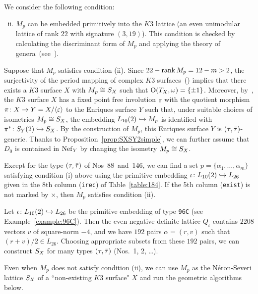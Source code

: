\documentclass{amsart}
\numberwithin{procedure}{section}
\begin{document}
%
We consider the following condition:
%
\begin{enumerate}[(i)]
\setcounter{enumi}{1}
%
\item $M_p$ can be embedded primitively
into the $K3$ lattice
(an even unimodular lattice of rank $22$ with signature $(3, 19)$).
This condition is checked by calculating the discriminant form of $M_p$
and applying the theory of genera~(see~\cite{Nikulin79}).
%
\end{enumerate}
%
Suppose that $M_p$ satisfies condition (ii).
Since $22-\operatorname{\mathrm{rank}}\nolimits M_{p}=12-m>2$,
the surjectivity of the period mapping
of complex $K3$ surfaces~(\cite[Chapter~VIII]{CCSBook}) implies that
there exists a $K3$ surface $X$ with $M_p \cong S_{X} $
such that $\mathord{\mathrm{O}}(T_X, \omega)=\{\pm 1\}$.
Moreover,
by~\cite{Keum1990},
the $K3$ surface $X$ has a fixed point free involution $\varepsilon$
with the quotient morphism $\pi\colon X\to Y=X/\langle\varepsilon\rangle$
to the Enriques surface $Y$
such that, under suitable choices of
isometries $M_p \cong S_{X} $, the embedding $L_{10}(2)\hookrightarrow M_p$
is identified with $\pi^*\colon S_{Y}(2)\hookrightarrow S_{X}$.
By the construction of $M_p$,
this Enriques surface $Y$ is $(\tau, \bar{\tau})$-generic.
Thanks to Proposition~\ref{prop:SXSY2simple},
we can further assume that
$D_0$ is contained in $\mathord{\rm Nef}_{Y}$ by
changing the isometry $M_p \cong S_{X}$.
%
\par
%
Except for the type $(\tau, \bar{\tau})$ of Nos~88~and~146,
we can find a set $p=\{\alpha_1, \dots, \alpha_m\}$ satisfying condition (i)  above
using the primitive embedding $\iota\colon L_{10}(2)\hookrightarrow L_{26}$
given in the 8th column ({\tt irec})  of Table~\ref{table:184}.
If the 5th column ({\tt exist}) is not marked by $\times$, then  $M_p$  satisfies 
condition (ii). 
%
\begin{example}\label{example:constructSX}
Let $\iota\colon L_{10}(2)\hookrightarrow L_{26}$
be the primitive embedding of type {\tt 96C}
(see Example~\ref{example:96C}).
Then the even negative definite lattice $Q_{\iota}$
contains  $2208$ vectors $v$ of square-norm  $-4$,
and we have $192$ pairs $\alpha=(r, v)$ such that $(r+v)/2\in L_{26}$.
Choosing appropriate subsets  from these $192$ pairs,
we can construct $S_{X}$ for many types $(\tau, \bar{\tau})$ (Nos.~1, 2, \dots).
\end{example}
%
\begin{remark}\label{rem:nonexisting}
Even when $M_p$ does not satisfy condition (ii),
we can use $M_p$ as the N\'eron-Severi lattice $S_{X}$ of a  ``non-existing $K3$ surface" $X$
and run the geometric algorithms below.
\end{remark}
%
%
%
\end{document}
